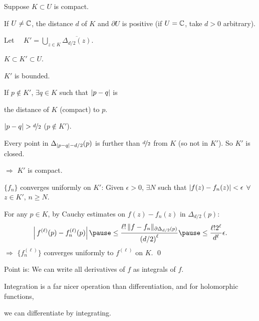 \documentclass[10pt,aspectratio=169]{beamer}
\begin{document}
\begin{frame}
Suppose $K \subset U$ is compact.

\medskip
\pause

If $U \not= {\mathbb{C}}$, the distance $d$ of
$K$ and $\partial U$ is positive
(if $U={\mathbb{C}}$, take $d > 0$ arbitrary).

\medskip
\pause

Let
$\displaystyle
\quad
K' = \bigcup_{z \in K} \overline{\Delta_{d/2}(z)} .
$

\medskip
\pause

$K \subset K' \subset U$.

\vspace*{-0.5in}
\hspace*{2.5in}%
\pause

\vspace*{-0.6in}

$K'$ is bounded.

\pause

If $p \notin K'$, $\exists q \in K$ such that
$\lvert {p-q} \rvert$ is

the distance of $K$ (compact) to $p$.

\pause
$\lvert {p-q} \rvert > \nicefrac{d}{2}$  \quad ($p\not\in K'$).

\pause
Every point in $\Delta_{\lvert {p-q} \rvert-d/2}(p)$
is further than $\nicefrac{d}{2}$ from $K$ (so not in $K'$).  So $K'$ is closed.

\pause

$\Rightarrow$ $K'$ is compact.

\medskip
\pause

$\{ f_n \}$ converges uniformly on $K'$:
\pause
Given $\epsilon > 0$, $\exists N$ such that
$\lvert {f(z)-f_n(z)} \rvert < \epsilon$ $\forall$ $z \in K'$, $n \geq N$.

\medskip
\pause
For any $p \in K$, by Cauchy estimates
on $f(z)-f_n(z)$
in $\Delta_{d/2}(p)$:
\pause
\begin{equation*}
\abs{
\,
f^{(\ell)}(p)
-
f_n^{(\ell)}(p)
}
\pause
\leq
\frac{\ell! \, \snorm{f-f_n}_{\partial \Delta_{d/2}(p)}}{{(d/2)}^{\ell}}
\pause
\leq
\frac{\ell!2^\ell}{d^\ell}\epsilon .
\end{equation*}
\pause
$\Rightarrow$ $\bigl\{ f_n^{(\ell)} \bigr\}$ converges uniformly to $f^{(\ell)}$ on $K$.
\qed
\end{frame}

\begin{frame}

Point is: We can write all derivatives of $f$ as integrals of $f$.

\medskip
\pause

Integration is a far nicer operation than differentiation, and for
holomorphic functions,

we can differentiate by integrating.
\end{frame}
\end{document}
